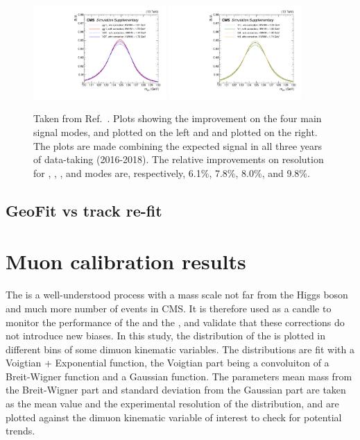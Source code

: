 \begin{figure}[!htb]
      \centering
      \captionsetup{justification=justified}
      \includegraphics[width=0.45\textwidth]{pics/muon_corr/GeoFit/performance/ggHVBF.pdf}
      \includegraphics[width=0.45\textwidth]{pics/muon_corr/GeoFit/performance/VHttH.pdf}
      \caption{Taken from Ref.~\cite{cmscollaboration2020evidence}.
               Plots showing the \GeoFit improvement on the four main \hmm signal modes, 
               \ggH and \qqH plotted on the left and \VH and \ttH plotted on the right.
               The plots are made combining the expected signal in all three years of data-taking (2016-2018).
               The relative improvements on \mmm resolution for \ggH, \qqH, \VH, and \ttH modes are, respectively,
               6.1\%, 7.8\%, 8.0\%, and 9.8\%.
               }
      \label{fig:geofit_sigs}
\end{figure}



\subsection{GeoFit vs track re-fit}\label{sec:track_refit}


\section{Muon calibration results} \label{sec:muon_cal}

The \zmm is a well-understood process with a mass scale not far from the Higgs boson and much more number of events in CMS.
It is therefore used as a candle to monitor the performance of the \RochCorr and the \GeoFit, 
and validate that these corrections do not introduce new biases.
In this study, the distribution of the \mmm is plotted in different bins of some dimuon kinematic variables.
The \mmm distributions are fit with a Voigtian + Exponential function, 
the Voigtian part being a convoluiton of a Breit-Wigner function and a Gaussian function.
The parameters mean mass from the Breit-Wigner part and standard deviation from the Gaussian part are 
taken as the mean value and the experimental resolution of the \mmm distribution,
and are plotted against the dimuon kinematic variable of interest to check for potential trends.

